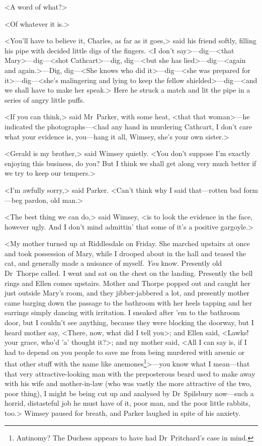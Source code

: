 <A word of what?>

<Of whatever it is.>

<You'll have to believe it, Charles, as far as it goes,> said his friend softly, filling his pipe with decided little digs of the fingers. <I don't say>—dig—<that Mary>—dig—<shot Cathcart>—dig, dig—<but she has lied>—dig—<again and again.>—Dig, dig—<She knows who did it>—dig—<she was prepared for it>—dig—<she's malingering and lying to keep the fellow shielded>—dig—<and we shall have to make her speak.> Here he struck a match and lit the pipe in a series of angry little puffs.

<If you can think,> said Mr~Parker, with some heat, <that that woman>—he indicated the photographs—<had any hand in murdering Cathcart, I don't care what your evidence is, you—hang it all, Wimsey, she's your own sister.>

<Gerald is my brother,> said Wimsey quietly. <You don't suppose I'm exactly enjoying this business, do you? But I think we shall get along very much better if we try to keep our tempers.>

<I'm awfully sorry,> said Parker. <Can't think why I said that—rotten bad form—beg pardon, old man.>

<The best thing we can do,> said Wimsey, <is to look the evidence in the face, however ugly. And I don't mind admittin' that some of it's a positive gargoyle.>

<My mother turned up at Riddlesdale on Friday. She marched upstairs at once and took possession of Mary, while I drooped about in the hall and teased the cat, and generally made a nuisance of myself. \emph{You} know. Presently old Dr~Thorpe called. I went and sat on the chest on the landing. Presently the bell rings and Ellen comes upstairs. Mother and Thorpe popped out and caught her just outside Mary's room, and they jibber-jabbered a lot, and presently mother came barging down the passage to the bathroom with her heels tapping and her earrings simply dancing with irritation. I sneaked after 'em to the bathroom door, but I couldn't see anything, because they were blocking the doorway, but I heard mother say, <There, now, what did I tell you>; and Ellen said, <Lawks! your grace, who'd 'a' thought it?>; and my mother said, <All I can say is, if I had to depend on you people to save me from being murdered with arsenic or that other stuff with the name like anemones\footnote{Antinomy? The Duchess appears to have had Dr~Pritchard's case in mind.}>—you know what I mean—that that very attractive-looking man with the preposterous beard used to make away with his wife and mother-in-law (who was vastly the more attractive of the two, poor thing), I might be being cut up and analysed by Dr~Spilsbury now—such a horrid, distasteful job he must have of it, poor man, and the poor little rabbits, too.> Wimsey paused for breath, and Parker laughed in spite of his anxiety.

